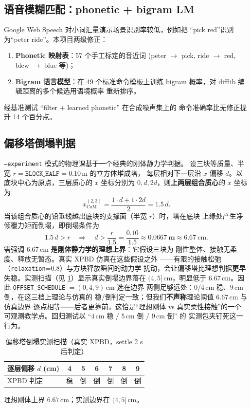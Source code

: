 \documentclass[12pt, a4paper, UTF8]{ctexart}
\begin{document}
\subsection{语音模糊匹配：phonetic + bigram LM}
Google Web Speech 对小词汇量演示场景识别率较低，例如把
``pick red''识别为``peter ride''。本项目两级修正：
\begin{enumerate}[leftmargin=*]
  \item \textbf{Phonetic 映射表}：57 个手工标定的音近词
    (peter $\to$ pick, ride $\to$ red, blew $\to$ blue 等)；
  \item \textbf{Bigram 语言模型}：在 49 个标准命令模板上训练
    bigram 概率，对 difflib 编辑距离的多个候选用语境概率
    重新排序。
\end{enumerate}
经基准测试 ``filter + learned phonetic'' 在合成噪声集上的
命令准确率比无修正提升 14 个百分点。

\subsection{偏移塔倒塌判据}\label{ssec:topple}
\texttt{--experiment} 模式的物理课基于一个经典的刚体静力学判据。
设三块等质量、半宽 $r = \texttt{BLOCK\_HALF} = 0.10$\,m 的立方体堆成塔，
每层相对下一层沿 $x$ 偏移 $d$。以底块中心为原点，三层质心的 $x$
坐标分别为 $0, d, 2d$，则\textbf{上两层组合质心}的 $x$ 坐标为
\[
x_{\text{CoM}}^{(2,3)} = \frac{1\cdot d + 1\cdot 2d}{2} = 1.5\,d.
\]
当该组合质心的铅垂线越出底块的支撑面（半宽 $r$）时，塔在底块
上缘处产生净倾覆力矩而倒塌，即倒塌条件为
\[
1.5\,d > r \quad\Longrightarrow\quad
d > \frac{r}{1.5} = \frac{0.10}{1.5} \approx \mathbf{0.0667\ \text{m}}
\approx 6.67\ \text{cm}.
\]
需强调 $6.67$\,cm 是\textbf{刚体静力学的理想上界}：它假设三块为
刚性整体、接触无柔度、释放无暂态。真实 XPBD 仿真在这些假设之外
——有限的接触松弛（\texttt{relaxation}=0.8）与方块释放瞬间的动力学
扰动，会让偏移塔比理想判据\textbf{更早}失稳。实测扫描（见
\ref{tab:topple}）显示真实倒塌边界落在 $(4, 5]$\,cm，明显低于
$6.67$\,cm。因此 \texttt{OFFSET\_SCHEDULE} $= (0, 4, 9)$\,cm 选在边界
两侧足够远处：$0$/$4$\,cm 稳、$9$\,cm 倒，在这三档上理论与仿真的
稳/倒判定一致；但我们\textbf{不声称}理论阈值 $6.67$\,cm 与仿真边界
逐点相等——后者更靠前，这恰是``理想刚体 vs 真实柔性接触''的一个
可观测教学点。回归测试以 ``$4$\,cm 稳 / $5$\,cm 倒 / $9$\,cm 倒'' 的
实测包夹钉死这一行为。

\begin{table}[h]
\centering\small
\caption{偏移塔倒塌实测扫描（真实 XPBD，settle 2 s 后判定）}
\label{tab:topple}
\begin{tabular}{lcccccc}
\toprule
逐层偏移 $d$ (cm) & 4 & 5 & 6 & 7 & 8 & 9 \\
\midrule
XPBD 判定 & 稳 & 倒 & 倒 & 倒 & 倒 & 倒 \\
\bottomrule
\end{tabular}

\smallskip
\footnotesize 理想刚体上界 $6.67$\,cm；实测边界在 $(4,5]$\,cm。
\end{table}
\end{document}
